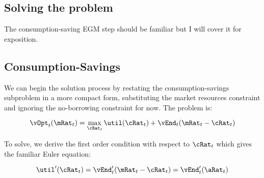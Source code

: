 \documentclass[\econtexRoot/EGMN]{subfiles}
\begin{document}
%

\subsection{Solving the problem}

The consumption-saving EGM step should be familiar but I will cover it for exposition.

\subsection{Consumption-Savings}

We can begin the solution process by restating the consumption-savings subproblem in a more compact form, substituting the market resources constraint and ignoring the no-borrowing constraint for now. The problem is:

\begin{equation}
    \vOpt_{t}(\mRat_{t}) = \max_{\cRat_{t}} \util(\cRat_{t}) +
    \vEnd_{t}(\mRat_{t}-\cRat_{t})
\end{equation}

To solve, we derive the first order condition with respect to $\cRat_{t}$ which gives the familiar Euler equation:

\begin{equation}
    \util'(\cRat_t) = \vEnd_{t}'(\mRat_{t} - \cRat_{t}) =
    \vEnd_{t}'(\aRat_{t})
\end{equation}
\end{document}
